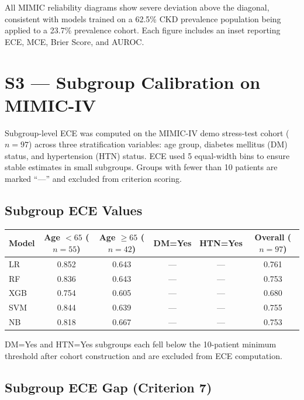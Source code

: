\documentclass[11pt]{article}
\begin{document}
All MIMIC reliability diagrams show severe deviation above the diagonal,
consistent with models trained on a 62.5\% CKD prevalence population being
applied to a 23.7\% prevalence cohort. Each figure includes an inset
reporting ECE, MCE, Brier Score, and AUROC.

\clearpage

\section*{S3 — Subgroup Calibration on MIMIC-IV}

Subgroup-level ECE was computed on the MIMIC-IV demo stress-test cohort
($n = 97$) across three stratification variables: age group, diabetes
mellitus (DM) status, and hypertension (HTN) status. ECE used 5
equal-width bins to ensure stable estimates in small subgroups. Groups
with fewer than 10 patients are marked ``---'' and excluded from
criterion scoring.

\subsection*{Subgroup ECE Values}

\begin{center}
\begin{tabular}{lccccc}
\toprule
Model & Age $<65$ ($n=55$) & Age $\geq 65$ ($n=42$) & DM=Yes & HTN=Yes & Overall ($n=97$) \\
\midrule
LR  & 0.852 & 0.643 & --- & --- & 0.761 \\
RF  & 0.836 & 0.643 & --- & --- & 0.753 \\
XGB & 0.754 & 0.605 & --- & --- & 0.680 \\
SVM & 0.844 & 0.639 & --- & --- & 0.755 \\
NB  & 0.818 & 0.667 & --- & --- & 0.753 \\
\bottomrule
\end{tabular}
\end{center}

DM=Yes and HTN=Yes subgroups each fell below the 10-patient minimum
threshold after cohort construction and are excluded from ECE computation.

\subsection*{Subgroup ECE Gap (Criterion 7)}
\end{document}

